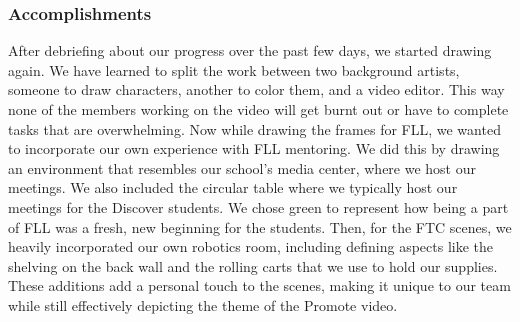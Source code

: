 \subsubsection*{Accomplishments}
After debriefing about our progress over the past few days, we started drawing again. We have learned to split the work between two background artists, someone to draw characters, another to color them, and a video editor. This way none of the members working on the video will get burnt out or have to complete tasks that are overwhelming. Now while drawing the frames for FLL, we wanted to incorporate our own experience with FLL mentoring. We did this by drawing an environment that resembles our school's media center, where we host our meetings. We also included the circular table where we typically host our meetings for the Discover students. We chose green to represent how being a part of FLL was a fresh, new beginning for the students. Then, for the FTC scenes, we heavily incorporated our own robotics room, including defining aspects like the shelving on the back wall and the rolling carts that we use to hold our supplies. These additions add a personal touch to the scenes, making it unique to our team while still effectively depicting the theme of the Promote video.

